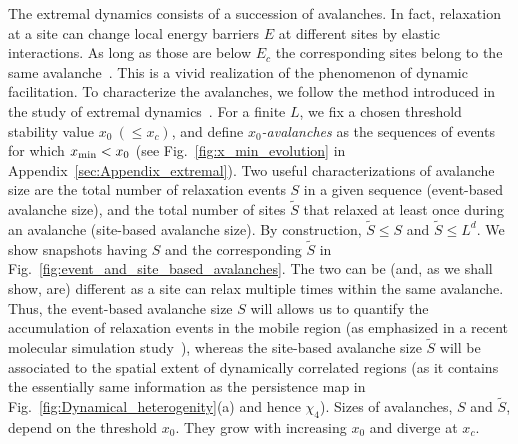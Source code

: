 \documentclass[pre,twocolumn,superscriptaddress,tightenlines,showpacs,longbibliography,floatfix,footinbib]{revtex4-1}
\begin{document}
The extremal dynamics consists of a succession of avalanches. In fact, relaxation at a site can change local energy barriers $E$ at different sites by elastic interactions. As long as those are below $E_c$ the corresponding sites belong to the same avalanche~\cite{paczuski1996avalanche}. 
This is a vivid realization of the phenomenon of dynamic facilitation.
To characterize the avalanches, we follow the method introduced in the study of extremal dynamics~\cite{paczuski1996avalanche,purrello2017creep}. 
For a finite $L$, we fix a chosen threshold stability value $x_0 \  (\leq x_c)$, and define {\it $x_0$-avalanches} as the sequences of events for which $x_{\rm min}<x_0$ (see Fig.~\ref{fig:x_min_evolution} in Appendix~\ref{sec:Appendix_extremal}). 
Two useful characterizations of avalanche size are the total number of relaxation events $S$ in a given sequence (event-based avalanche size), and the total number of sites $\tilde S$ that relaxed at least once during an avalanche (site-based avalanche size).
By construction, $\tilde S \leq S$ and $\tilde S \leq L^d$.
We show snapshots having $S$ and the corresponding $\tilde S$ in Fig.~\ref{fig:event_and_site_based_avalanches}. The two can be (and, as we shall show, are) different as a site can relax multiple times within the same avalanche.
Thus, the event-based avalanche size $S$ will allows us to quantify the accumulation of relaxation events in the mobile region (as emphasized in a recent molecular simulation study~\cite{scalliet2022thirty}), whereas the site-based avalanche size $\tilde S$ will be associated to the spatial extent of dynamically correlated regions (as it contains the essentially same information as the persistence map in Fig.~\ref{fig:Dynamical_heterogenity}(a) and hence $\chi_4$). 
Sizes of avalanches, $S$ and $\tilde S$, depend on the threshold $x_0$. They grow with increasing $x_0$ and diverge at $x_c$. 
\end{document}
